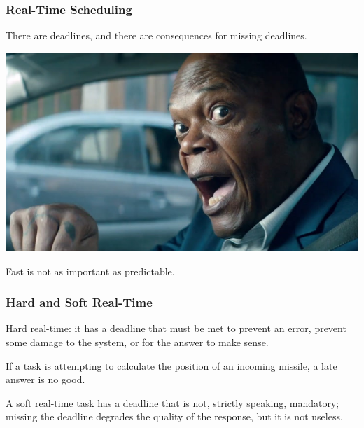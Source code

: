 \begin{frame}
\frametitle{Real-Time Scheduling}

There are deadlines, and there are consequences for missing deadlines. 

\begin{center}
	\includegraphics[width=\textwidth]{images/ticktock.jpg}
\end{center}

Fast is not as important as predictable.

\end{frame}

\begin{frame}
\frametitle{Hard and Soft Real-Time}

\alert{Hard real-time}: it has a deadline that must be met to prevent an error, prevent some damage to the system, or for the answer to make sense. 

If a task is attempting to calculate the position of an incoming missile, a late answer is no good. 

A \alert{soft real-time} task has a deadline that is not, strictly speaking, mandatory; missing the deadline degrades the quality of the response, but it is not useless.


\end{frame}



